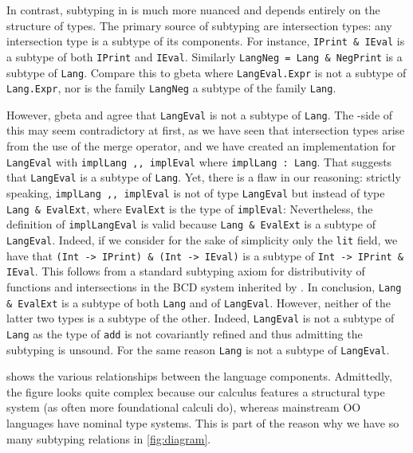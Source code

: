 In contrast, subtyping in \name is much more nuanced and depends entirely on the
structure of types. The primary source of subtyping are intersection types:
any intersection type is a subtype of its components. For instance, 
\lstinline{IPrint & IEval} is a subtype of both \lstinline{IPrint} and
\lstinline{IEval}. Similarly \lstinline{LangNeg = Lang & NegPrint} is a subtype
of \lstinline{Lang}. Compare this to gbeta where \lstinline{LangEval.Expr} is
not a subtype of \lstinline{Lang.Expr}, nor is the family \lstinline{LangNeg} a
subtype of the family \lstinline{Lang}.

However, gbeta and \name agree that \lstinline{LangEval} is not a subtype of
\lstinline{Lang}. The \name-side of this may seem contradictory at first, as we
have seen that intersection types arise from the use of the merge operator, and
we have created an implementation for \lstinline{LangEval} with
\lstinline{implLang ,, implEval} where \lstinline{implLang : Lang}. That
suggests that \lstinline{LangEval} is a subtype of \lstinline{Lang}.
Yet, there is a flaw in our reasoning:
strictly speaking, \lstinline{implLang ,, implEval} is not of
type \lstinline{LangEval} but instead of type \lstinline{Lang & EvalExt}, where
\lstinline{EvalExt} is the type of \lstinline{implEval}:
Nevertheless, the definition of \lstinline{implLangEval} is valid because
\lstinline{Lang & EvalExt} is a subtype of \lstinline{LangEval}.
Indeed, if we consider for the sake of simplicity only the \lstinline{lit}
field, we have that \lstinline{(Int -> IPrint) & (Int -> IEval)} is a
subtype of \lstinline{Int -> IPrint & IEval}. This follows from a standard
subtyping axiom for distributivity of functions and intersections in the BCD system inherited by \name.
In conclusion, \lstinline{Lang & EvalExt} is a subtype of both \lstinline{Lang}
and of \lstinline{LangEval}. However, neither of the latter two types is a subtype of the other.
Indeed, \lstinline{LangEval} is not a subtype of \lstinline{Lang} as the type
of \lstinline{add} is not covariantly refined and thus admitting the subtyping
is unsound. For the same reason \lstinline{Lang} is not a subtype of \lstinline{LangEval}.


 shows the various relationships between the language
components. Admittedly, the figure looks quite complex because our calculus
features a structural type system (as often more foundational calculi do),
whereas mainstream OO languages have nominal type systems. This is part of the
reason why we have so many subtyping relations in \cref{fig:diagram}.

